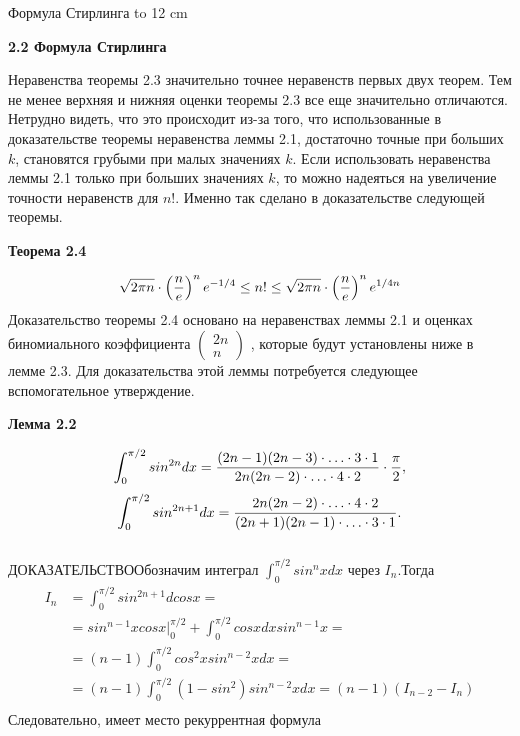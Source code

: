 \documentclass[12pt]{article}
\date{}
\begin{document}
     Формула Стирлинга \hbox to 12 cm {}
    \newpage
\begin{flushleft}
\Large \bf{2.2 Формула Стирлинга }
\end{flushleft}
Неравенства теоремы 2.3 значительно точнее неравенств первых двух теорем. Тем не менее верхняя и нижняя оценки теоремы 2.3 все еще значительно отличаются. Нетрудно видеть, что это происходит из-за того, что использованные в доказательстве теоремы неравенства леммы 2.1, достаточно точные при больших $k$, становятся грубыми при малых значениях $k$.
Если использовать неравенства леммы 2.1 только при больших значениях $k$, то можно надеяться на увеличение точности неравенств для $n!$. Именно так сделано в доказательстве следующей теоремы.\\
\begin{flushleft}
\large \bf{Теорема 2.4}
\end{flushleft}
\begin{equation}
\sqrt{2\pi n}\cdot \left(\frac{n}{e}\right)^n e^{-1/4}\le n!\le \sqrt{2\pi n}\cdot \left(\frac{n}{e}\right)^n e^{1/4n} \notag
\end{equation}
  Доказательство теоремы 2.4 основано на неравенствах леммы 2.1 и оценках биномиального коэффициента $\begin{pmatrix} 2n\\n \end{pmatrix}$ , которые будут установлены ниже в лемме 2.3. Для доказательства этой леммы потребуется следующее вспомогательное утверждение.
\begin{flushleft}
\large \bf{Лемма 2.2}
\end{flushleft}
\begin{equation}
  \int_0^{\pi/2}{sin^{2n}d x}= \frac{(2n-1)(2n-3) \cdot \ldots \cdot 3 \cdot 1}{2n(2n-2) \cdot \ldots  \cdot 4 \cdot 2} \cdot \frac{\pi}{2},  \notag
\end{equation}
\begin{equation}
    \int_0^{\pi/2}{sin^{2n+1}d x}= \frac{2n(2n-2) \cdot \ldots \cdot 4 \cdot 2}{(2n+1)(2n-1) \cdot \ldots \cdot 3 \cdot 1}.\notag
\end{equation}\\
\textsc{ДОКАЗАТЕЛЬСТВО}\text{ }Обозначим интеграл $\int_0^{\pi/2}{sin^n x d x}$ через $I_n$.Тогда 
\begin{align*}
        I_n&=\int_0^{\pi/2}{sin^{2n+1}d cos x}=\\
        &= sin^{n-1}x cos{x}\bigl|_0^{\pi/2}+\int_0^{\pi/2}{cos{x}d x}sin^{n-1}x=\\ &= (n-1)\int_0^{\pi/2}{cos^2{x}sin^{n-2}{x}d x}=\\ &= (n-1)\int_0^{\pi/2}{(1-sin^2)sin^{n-2}{x}d x}=(n-1)(I_{n-2}-I_n)\\ 
\end{align*} Следовательно, имеет место рекуррентная формула
\end{document}
